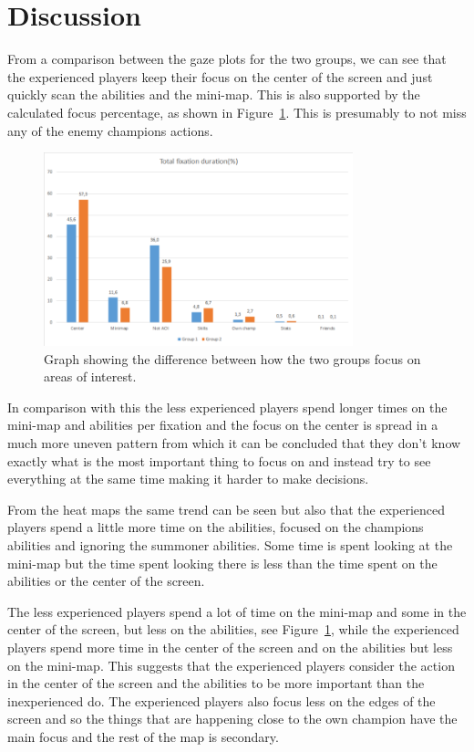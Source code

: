 \documentclass[notitlepage]{report}
\begin{document}
\section{Discussion}
From a comparison between the gaze plots for the two groups, we can see that the experienced players keep their focus on the center of the screen and just quickly scan the abilities and the mini-map. This is also supported by the calculated focus percentage, as shown in Figure~\ref{aoi}. This is presumably to not miss any of the enemy champions actions.

\begin{figure}[h]
\centering
\includegraphics[width=0.8\textwidth]{images/AOIChart}
\caption{Graph showing the difference between how the two groups focus on areas of interest.}
\label{aoi}
\end{figure}

In comparison with this the less experienced players spend longer times on the mini-map and abilities per fixation and the focus on the center is spread in a much more uneven pattern from which it can be concluded that they don't know exactly what is the most important thing to focus on and instead try to see everything at the same time making it harder to make decisions.

From the heat maps the same trend can be seen but also that the experienced players spend a little more time on the abilities, focused on the champions abilities and ignoring the summoner abilities. Some time is spent looking at the mini-map but the time spent looking there is less than the time spent on the abilities or the center of the screen.

The less experienced players spend a lot of time on the mini-map and some in the center of the screen, but less on the abilities, see Figure~\ref{aoi}, while the experienced players spend more time in the center of the screen and on the abilities but less on the mini-map. This suggests that the experienced players consider the action in the center of the screen and the abilities to be more important than the inexperienced do. The experienced players also focus less on the edges of the screen and so the things that are happening close to the own champion have the main focus and the rest of the map is secondary.
\end{document}
